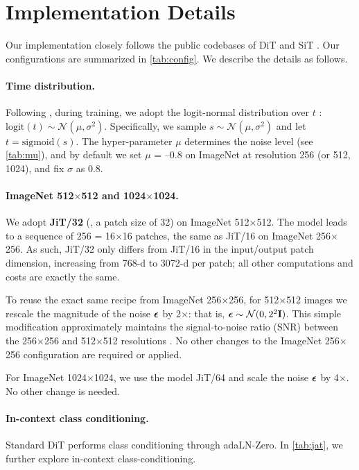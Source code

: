 \section{Implementation Details}
Our implementation closely follows the public codebases of DiT \cite{Peebles2023} and SiT \cite{ma2024sit}.
Our configurations are summarized in \cref{tab:config}.
We describe the details as follows.

\paragraph{Time distribution.} Following \cite{esser2024scaling}, during training, we adopt the logit-normal distribution over $t$ \cite{esser2024scaling}: $\text{logit}(t) \sim \mathcal{N}(\mu,\sigma^2)$.
Specifically, we sample $s\sim \mathcal{N}(\mu,\sigma^2)$ and let $t{=}\text{sigmoid}(s)$. The hyper-parameter $\mu$ determines the noise level (see \cref{tab:mu}), and by default we set $\mu$ = --0.8 on ImageNet at resolution 256 (or 512, 1024), and fix $\sigma$ as 0.8.

\paragraph{ImageNet 512${\times}$512 and 1024${\times}$1024.} We adopt \textbf{JiT/32} (\ie, a patch size of 32) on ImageNet 512${\times}$512. The model leads to a sequence of 256 = 16$\times$16 patches, the same as JiT/16 on ImageNet 256${\times}$256. As such, JiT/32 only differs from JiT/16 in the input/output patch dimension, increasing from 768-d to 3072-d per patch; all other computations and costs are exactly the same.

To reuse the exact same recipe from ImageNet 256${\times}$256, for 512${\times}$512 images we rescale the magnitude of the noise $\bm{\epsilon}$ by 2$\times$: that is, $\bm{\epsilon} \sim \mathcal{N}(0, 2^2 \mathbf{I})$. This simple modification approximately maintains the signal-to-noise ratio (SNR) between the 256${\times}$256 and 512${\times}$512 resolutions \cite{hoogeboom2023simple,chen2023importance,hoogeboom2024simpler}.
No other changes to the ImageNet 256${\times}$256 configuration are required or applied.

For ImageNet 1024${\times}$1024, we use the model JiT/64 and scale the noise $\bm{\epsilon}$ by 4$\times$. No other change is needed.

\paragraph{In-context class conditioning.} Standard DiT \cite{Peebles2023} performs class conditioning through adaLN-Zero.
In \cref{tab:jat}, we further explore in-context class-conditioning.

